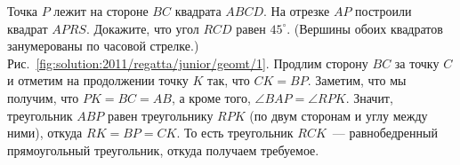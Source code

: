 \problem
Точка $P$ лежит на стороне $BC$ квадрата $ABCD$.
На отрезке $AP$ построили квадрат $APRS$.
Докажите, что угол $RCD$ равен $45^\circ$.
(Вершины обоих квадратов занумерованы по часовой стрелке.)
%
\label{solution:2011/regatta/junior/geomt/1}%
Рис.~\ref{fig:solution:2011/regatta/junior/geomt/1}.
Продлим сторону $BC$ за точку $C$ и отметим на продолжении точку $K$ так, что
$C K = B P$.
Заметим, что мы получим, что $PK = BC = AB$, а кроме того,
$\angle BAP = \angle RPK$.
Значит, треугольник $ABP$ равен треугольнику $RPK$
(по двум сторонам и углу между ними),
откуда $RK = BP = CK$.
То есть треугольник $RCK$~--- равнобедренный прямоугольный треугольник, откуда
получаем требуемое.
\endproblem
